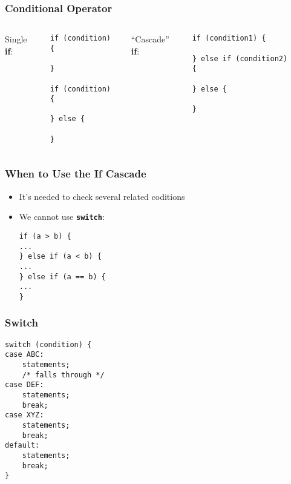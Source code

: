 \documentclass[screen]{beamer}
\begin{document}
\begin{frame}[fragile]
\frametitle{Conditional Operator}%
%
\begin{columns}
Single \textbf{if}:
\begin{lstlisting}
if (condition) {

}

if (condition) {

} else {

}
\end{lstlisting}
``Cascade'' \textbf{if}:
\begin{lstlisting}
if (condition1) {

} else if (condition2) {

} else {

}
\end{lstlisting}
$\;$\\
$\;$\\
\end{columns}
\end{frame}

\begin{frame}[fragile]
\frametitle{When to Use the If Cascade}%
%
\begin{itemize}[<+->]
	\item It's needed to check several \alert{related} coditions
	\item We cannot use {\bf \texttt{switch}}: 
\begin{lstlisting}
if (a > b) {
...
} else if (a < b) {
...
} else if (a == b) {
...
}
\end{lstlisting}
\end{itemize}
\end{frame}

\begin{frame}[fragile]
\frametitle{Switch}%
%
\begin{lstlisting}
switch (condition) {
case ABC:
    statements;
    /* falls through */
case DEF:
    statements;
    break;
case XYZ:
    statements;
    break;
default:
    statements;
    break;
}
\end{lstlisting}
\end{frame}
\end{document}

